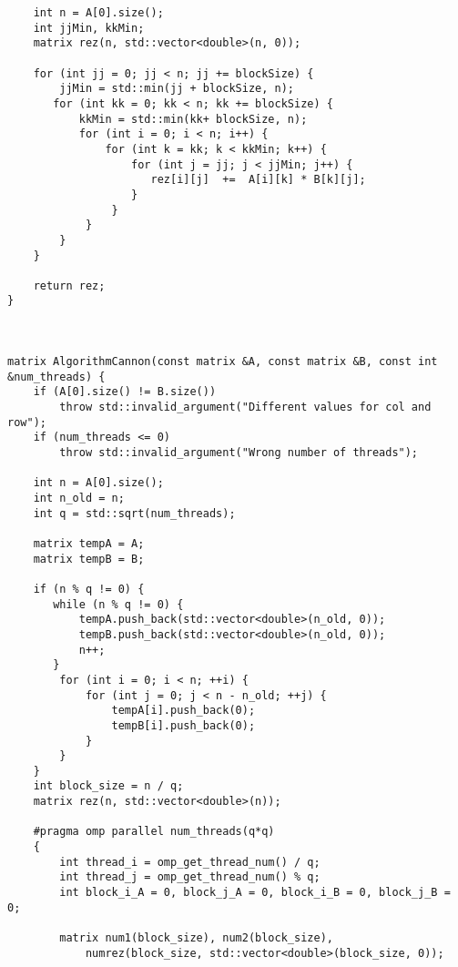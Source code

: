 \documentclass{report}
\begin{document}
\begin{lstlisting}
    int n = A[0].size();
    int jjMin, kkMin;
    matrix rez(n, std::vector<double>(n, 0));

    for (int jj = 0; jj < n; jj += blockSize) {
        jjMin = std::min(jj + blockSize, n);
       for (int kk = 0; kk < n; kk += blockSize) {
           kkMin = std::min(kk+ blockSize, n);
           for (int i = 0; i < n; i++) {
               for (int k = kk; k < kkMin; k++) {
                   for (int j = jj; j < jjMin; j++) {
                      rez[i][j]  +=  A[i][k] * B[k][j];
                   }
                }
            }
        }
    }

    return rez;
}



matrix AlgorithmCannon(const matrix &A, const matrix &B, const int &num_threads) {
    if (A[0].size() != B.size())
        throw std::invalid_argument("Different values for col and row");
    if (num_threads <= 0)
        throw std::invalid_argument("Wrong number of threads");

    int n = A[0].size();
    int n_old = n;
    int q = std::sqrt(num_threads);

    matrix tempA = A;
    matrix tempB = B;

    if (n % q != 0) {
       while (n % q != 0) {
           tempA.push_back(std::vector<double>(n_old, 0));
           tempB.push_back(std::vector<double>(n_old, 0));
           n++;
       }
        for (int i = 0; i < n; ++i) {
            for (int j = 0; j < n - n_old; ++j) {
                tempA[i].push_back(0);
                tempB[i].push_back(0);
            }
        }
    }
    int block_size = n / q;
    matrix rez(n, std::vector<double>(n));

    #pragma omp parallel num_threads(q*q)
    {
        int thread_i = omp_get_thread_num() / q;
        int thread_j = omp_get_thread_num() % q;
        int block_i_A = 0, block_j_A = 0, block_i_B = 0, block_j_B = 0;

        matrix num1(block_size), num2(block_size),
            numrez(block_size, std::vector<double>(block_size, 0));


\end{lstlisting}
\end{document}
